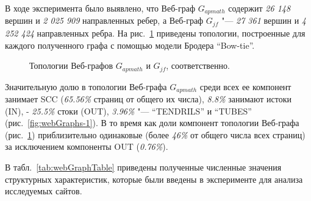 В ходе эксперимента было выявлено, что Веб-граф \(G_{apmath}\) содержит \textit{26 148} вершин и \textit{2 025 909} направленных ребер, а Веб-граф \(G_{jf}\) "--- \textit{27 361} вершин и \textit{4 252 424} направленных ребра. На рис.~\cref{fig:webGraphs} приведены топологии, построенные для каждого полученного графа с помощью модели Бродера “Bow-tie”.

\begin{figure}[ht]
    \caption{Топологии Веб-графов \(G_{apmath}\) и \(G_{jf}\), соответственно.}\label{fig:webGraphs}
\end{figure}

Значительную долю в топологии Веб-графа \(G_{apmath}\) среди всех ее компонент занимает SCC (\textit{65.56\%} страниц от общего их числа), \textit{8.8\%} занимают истоки (IN), - \textit{25.5\%} стоки (OUT), \textit{3.96\%} "--- “TENDRILS” и “TUBES” (рис.~\cref{fig:webGraphs-1}). В то время как доли компонент топологии Веб-графа (рис.~\cref{fig:webGraphs}) приблизительно одинаковые (более \textit{46\%} от общего числа всех страниц) за исключением компоненты OUT (\textit{0.76\%}).

В табл.~\cref{tab:webGraphTable} приведены полученные численные значения структурных характеристик, которые были введены в эксперименте для анализа исследуемых сайтов.

